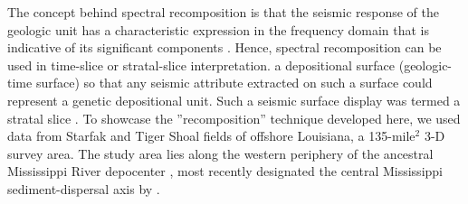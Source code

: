 
The concept behind spectral recomposition is that the seismic response of the geologic unit has a characteristic expression in the frequency domain that is indicative of its significant components \cite[]{Tomasso}. Hence, spectral recomposition can be used in time-slice or stratal-slice interpretation.   a depositional surface (geologic-time surface) so that any seismic attribute extracted on such a surface could represent a genetic depositional unit. Such a seismic surface display was termed a stratal slice \cite[]{Zeng2,Zeng25}. To showcase the ''recomposition'' technique developed here, we used data from Starfak and Tiger Shoal fields of offshore Louisiana, a 135-mile$^2$ 3-D survey area. The study area lies along the western periphery of the ancestral Mississippi River depocenter \cite[]{McGookey}, most recently designated the central Mississippi sediment-dispersal axis by \cite{Galloway}.

